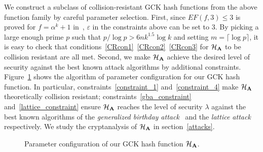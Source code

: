We construct a subclass of collision-resistant GCK hash functions from the above function family by careful parameter selection. First, since $EF(f,3) \leq 3$ is proved for $f=\alpha^{k}+1$ in~\cite{GCK}, $\varepsilon$ in the constraints above can be set to $3$. By picking a large enough prime $p$ such that $p/\log p > 6nk^{1.5} \log k$ and setting $m = \lceil \log p \rceil$, it is easy to check that conditions~\ref{CRcon1}~\ref{CRcon2}~\ref{CRcon3} for ${\cal H}_{\bf A}$ to be collision resistant are all met. %
Second, we make ${\cal H}_{\bf A}$ achieve the desired level of security against the best known attack algorithms by additional constraints. Figure~\ref{config_alg} shows the algorithm of parameter configuration for our GCK hash function. In particular, constraints~\ref{constraint_1} and~\ref{constraint_4} make ${\cal H}_{\bf A}$ theoretically collision resistant; constraints~\ref{gba_constraint} and~\ref{lattice_constraint} ensure ${\cal H}_{\bf A}$ reaches the level of security $\lambda$ against the best known algorithms of the {\it generalized birthday attack}~\cite{wagner02} and the {\it lattice attack}~\cite{lattice} respectively. We study the cryptanalysis of ${\cal H}_{\bf A}$ in section~\ref{attacks}.
\begin{figure}[h!]
{\centering
{}}
\caption{\label{config_alg}Parameter configuration of our GCK hash function ${\cal H}_{\bf A}$.}
\end{figure}


